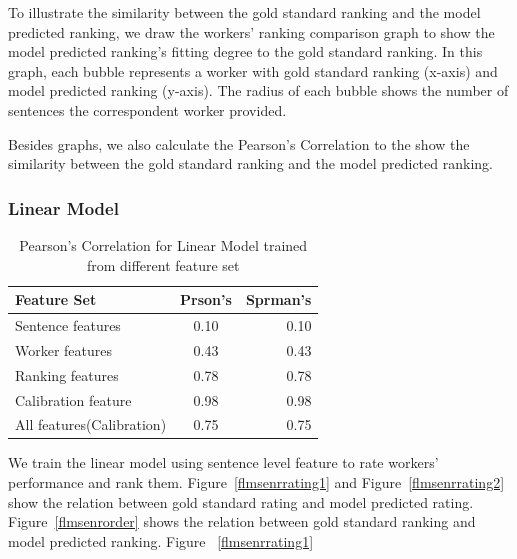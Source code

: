 \documentclass[11pt]{article}
\begin{document}
 To illustrate the similarity between the gold standard ranking and the model predicted ranking, we draw the workers' ranking comparison graph to show the model predicted ranking's fitting degree to the gold standard ranking.  In this graph, each bubble represents a worker with gold standard ranking (x-axis) and model predicted ranking (y-axis). The radius of each bubble shows the  number of sentences the correspondent worker provided.
 
 Besides graphs, we also calculate the Pearson's Correlation to the show the similarity between the gold standard ranking and the model predicted ranking.  
 \subsubsection{Linear Model}
 \begin{table}[htbp]
\begin{center}
\begin{tabular}{| l | c | r |  }
\hline \bf Feature Set & \bf Prson's  & \bf Sprman's  \\ \hline
Sentence features & 0.10&0.10 \\
Worker features & 0.43  & 0.43 \\
Ranking features & 0.78 & 0.78 \\
Calibration feature & 0.98& 0.98\\
All features(Calibration) & 0.75 & 0.75  \\
\hline
\end{tabular}
\end{center}
\caption{\label{tlmpearson} Pearson's Correlation for Linear Model trained from different feature set }
\end{table}
We train the linear model using sentence level feature to rate workers' performance and rank them.
Figure~\ref{flmsenrrating1} and Figure~\ref{flmsenrrating2} show the relation between gold standard rating and model predicted rating. Figure~\ref{flmsenrorder} shows the relation between gold standard ranking and model predicted ranking.
 Figure ~\ref{flmsenrrating1} 
\end{document}
